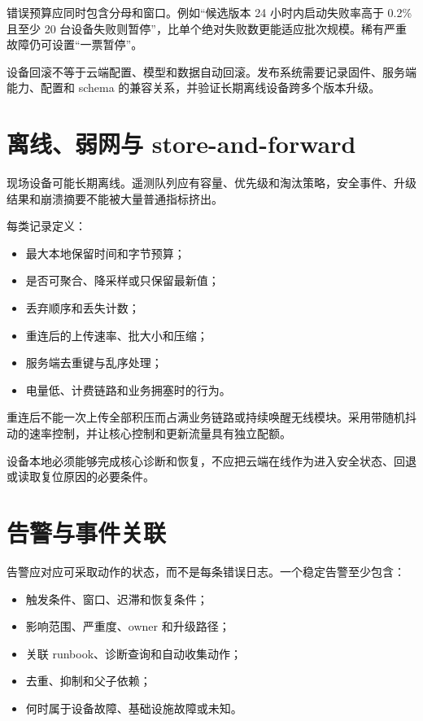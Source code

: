 错误预算应同时包含分母和窗口。例如“候选版本 24 小时内启动失败率高于 0.2\% 且至少 20 台设备失败则暂停”，比单个绝对失败数更能适应批次规模。稀有严重故障仍可设置“一票暂停”。

设备回滚不等于云端配置、模型和数据自动回滚。发布系统需要记录固件、服务端能力、配置和 schema 的兼容关系，并验证长期离线设备跨多个版本升级。

\section{离线、弱网与 store-and-forward}

现场设备可能长期离线。遥测队列应有容量、优先级和淘汰策略，安全事件、升级结果和崩溃摘要不能被大量普通指标挤出。

每类记录定义：

\begin{itemize}
  \item 最大本地保留时间和字节预算；
  \item 是否可聚合、降采样或只保留最新值；
  \item 丢弃顺序和丢失计数；
  \item 重连后的上传速率、批大小和压缩；
  \item 服务端去重键与乱序处理；
  \item 电量低、计费链路和业务拥塞时的行为。
\end{itemize}

重连后不能一次上传全部积压而占满业务链路或持续唤醒无线模块。采用带随机抖动的速率控制，并让核心控制和更新流量具有独立配额。

设备本地必须能够完成核心诊断和恢复，不应把云端在线作为进入安全状态、回退或读取复位原因的必要条件。

\section{告警与事件关联}

告警应对应可采取动作的状态，而不是每条错误日志。一个稳定告警至少包含：

\begin{itemize}
  \item 触发条件、窗口、迟滞和恢复条件；
  \item 影响范围、严重度、owner 和升级路径；
  \item 关联 runbook、诊断查询和自动收集动作；
  \item 去重、抑制和父子依赖；
  \item 何时属于设备故障、基础设施故障或未知。
\end{itemize}

